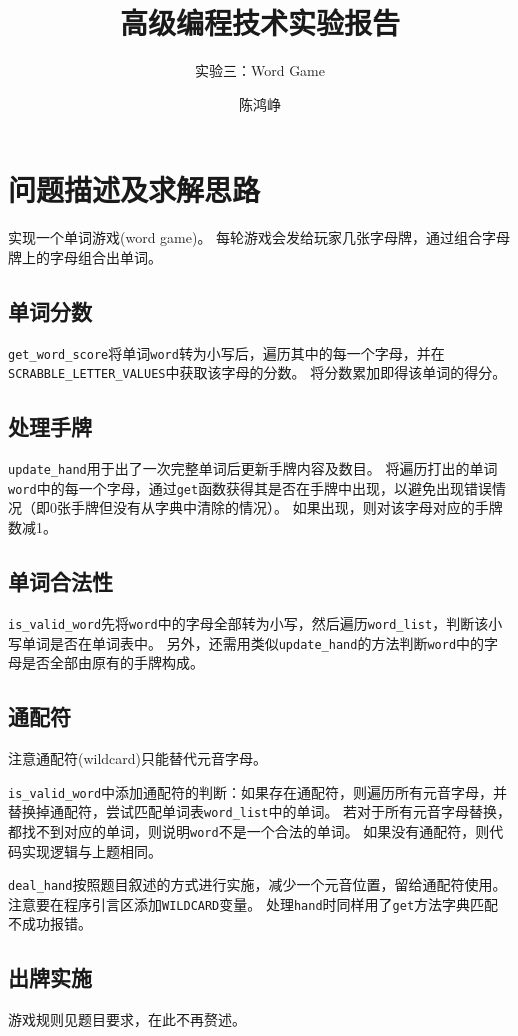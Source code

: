 \documentclass[logo,reportComp]{thesis}
\title{高级编程技术实验报告}
\subtitle{实验三：Word Game}
\author{陈鸿峥}
\begin{document}
\maketitle

\section{问题描述及求解思路}
实现一个单词游戏(word game)。
每轮游戏会发给玩家几张字母牌，通过组合字母牌上的字母组合出单词。

\subsection{单词分数}
\verb'get_word_score'将单词\verb'word'转为小写后，遍历其中的每一个字母，并在\verb'SCRABBLE_LETTER_VALUES'中获取该字母的分数。
将分数累加即得该单词的得分。

\subsection{处理手牌}
\verb'update_hand'用于出了一次完整单词后更新手牌内容及数目。
将遍历打出的单词\verb'word'中的每一个字母，通过\verb'get'函数获得其是否在手牌中出现，以避免出现错误情况（即0张手牌但没有从字典中清除的情况）。
如果出现，则对该字母对应的手牌数减1。

\subsection{单词合法性}
\verb'is_valid_word'先将\verb'word'中的字母全部转为小写，然后遍历\verb'word_list'，判断该小写单词是否在单词表中。
另外，还需用类似\verb'update_hand'的方法判断\verb'word'中的字母是否全部由原有的手牌构成。

\subsection{通配符}
注意通配符(wildcard)只能替代元音字母。

\verb'is_valid_word'中添加通配符的判断：如果存在通配符，则遍历所有元音字母，并替换掉通配符，尝试匹配单词表\verb'word_list'中的单词。
若对于所有元音字母替换，都找不到对应的单词，则说明\verb'word'不是一个合法的单词。
如果没有通配符，则代码实现逻辑与上题相同。

\verb'deal_hand'按照题目叙述的方式进行实施，减少一个元音位置，留给通配符使用。
注意要在程序引言区添加\verb'WILDCARD'变量。
处理\verb'hand'时同样用了\verb'get'方法字典匹配不成功报错。

\subsection{出牌实施}
游戏规则见题目要求，在此不再赘述。
\end{document}

